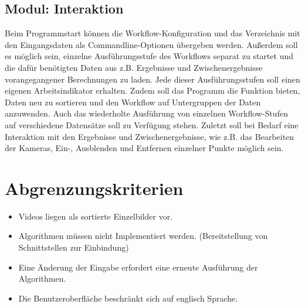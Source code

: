 \subsection{Modul: Interaktion}
Beim Programmstart können die Workflow-Konfiguration und das Verzeichnis mit den Eingangsdaten als Commandline-Optionen übergeben werden. Außerdem soll es möglich sein, einzelne Ausführungsstufe des Workflows separat zu startet und die dafür benötigten Daten aus z.B. Ergebnisse und Zwischenergebnisse vorangegangener Berechnungen zu laden. Jede dieser Ausführungsstufen soll einen eigenen Arbeitsindikator erhalten. Zudem soll das Programm die Funktion bieten, Daten neu zu sortieren und den Workflow auf Untergruppen der Daten anzuwenden. Auch das wiederholte Ausführung von einzelnen Workflow-Stufen auf verschiedene Datensätze soll zu Verfügung stehen. Zuletzt soll bei Bedarf eine Interaktion mit den Ergebnisse und Zwischenergebnisse, wie z.B. das Bearbeiten der Kameras, Ein-, Ausblenden und Entfernen einzelner Punkte möglich sein.

\section{Abgrenzungskriterien}
\begin{itemize}
	\item Videos liegen als sortierte Einzelbilder vor.
	\item Algorithmen müssen nicht Implementiert werden. (Bereitstellung von Schnittstellen zur Einbindung)
	\item Eine Änderung der Eingabe erfordert eine erneute Ausführung der Algorithmen.
	\item Die Benutzeroberfläche beschränkt sich auf englisch Sprache.
\end{itemize}